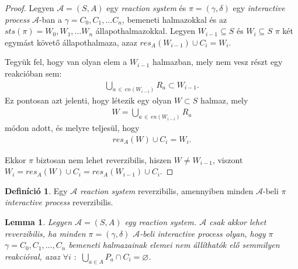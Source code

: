 \documentclass[12pt]{article}
\theoremstyle{definition}
\newtheorem*{definition*}{Definíció}
\theoremstyle{remark}
\theoremstyle{plain}
\theoremstyle{plain}
\newtheorem*{lemma*}{Lemma}
\let\emptyset\varnothing
\newcommand{\res}{\textit{res}}
\begin{document}
    \begin{proof}
        Legyen $\mathscr{A} = (S, A)$ egy \textit{reaction system} és $\pi=(\gamma, \delta)$ egy \textit{interactive process} $\mathscr{A}$-ban a $\gamma = C_{0}, C_{1}, \ldots C_{n}$, bemeneti halmazokkal és az $\textit{sts}(\pi)=W_{0},W_{1},\ldots W_{n}$ állapothalmazokkal. Legyen $W_{i - 1} \subseteq S$ és $W_{i} \subseteq S$ $\pi$ két egymást követő állapothalmaza, azaz $\res_{A}(W_{i-1}) \cup C_{i}=W_{i}$.
        
        Tegyük fel, hogy van olyan elem a $W_{i-1}$ halmazban, mely nem vesz részt egy reakcióban sem:
        \begin{align*}
            \bigcup_{a \,\in\, \textit{en}(W_{i-i})} R_{a} \subset W_{i-1}.
        \end{align*}
        Ez pontosan azt jelenti, hogy létezik egy olyan $W \subset S$ halmaz, mely
        \begin{align*}
            W = \bigcup_{a \,\in\, \textit{en}(W_{i-i})} R_{a}
        \end{align*}
        módon adott, és melyre teljesül, hogy
        \begin{align*}
            \res_{A}(W) \cup C_{i} = W_{i}.
        \end{align*}

        Ekkor $\pi$ biztosan nem lehet reverzibilis, hiszen $W \neq W_{i - 1}$, viszont $W_{i} = \res_{A}(W) \cup C_{i} = \res_{A}(W_{i - 1}) \cup C_{i}$.
    \end{proof}

    \begin{definition*}
        Egy $\mathscr{A}$ \textit{reaction system} reverzibilis, amennyiben minden $\mathscr{A}$-beli $\pi$ \textit{interactive process} reverzibilis.
    \end{definition*}

    \begin{lemma*}
        Legyen $\mathscr{A} = (S, A)$ egy \textit{reaction system}. $\mathscr{A}$ csak akkor lehet reverzibilis, ha minden $\pi = (\gamma, \delta)$ $\mathscr{A}$-beli \textit{interactive process} olyan, hogy $\pi$ $\gamma = C_{0}, C_{1}, \ldots, C_{n}$ bemeneti halmazainak elemei nem állíthatók elő semmilyen reakcióval, azaz $\forall i$ $:$ $\bigcup_{a \in A} P_{a} \cap C_{i} = \emptyset$.
    \end{lemma*}
\end{document}
